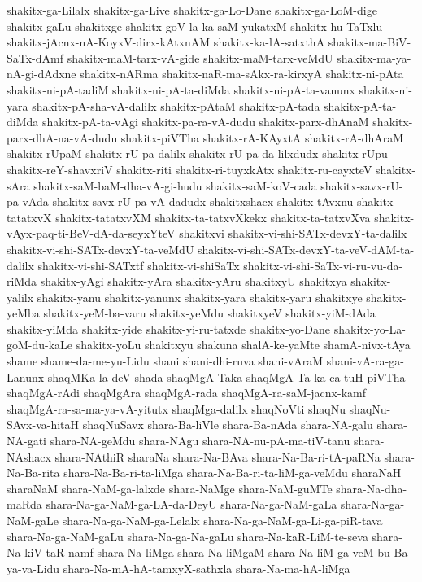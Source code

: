 {shakitx-ga-Lilalx
shakitx-ga-Live
shakitx-ga-Lo-Dane
shakitx-ga-LoM-dige
shakitx-gaLu
shakitxge
shakitx-goV-la-ka-saM-yukatxM
shakitx-hu-TaTxlu
shakitx-jAcnx-nA-KoyxV-dirx-kAtxnAM
shakitx-ka-lA-satxthA
shakitx-ma-BiV-SaTx-dAmf
shakitx-maM-tarx-vA-gide
shakitx-maM-tarx-veMdU
shakitx-ma-ya-nA-gi-dAdxne
shakitx-nARma
shakitx-naR-ma-sAkx-ra-kirxyA
shakitx-ni-pAta
shakitx-ni-pA-tadiM
shakitx-ni-pA-ta-diMda
shakitx-ni-pA-ta-vanunx
shakitx-ni-yara
shakitx-pA-sha-vA-dalilx
shakitx-pAtaM
shakitx-pA-tada
shakitx-pA-ta-diMda
shakitx-pA-ta-vAgi
shakitx-pa-ra-vA-dudu
shakitx-parx-dhAnaM
shakitx-parx-dhA-na-vA-dudu
shakitx-piVTha
shakitx-rA-KAyxtA
shakitx-rA-dhAraM
shakitx-rUpaM
shakitx-rU-pa-dalilx
shakitx-rU-pa-da-lilxdudx
shakitx-rUpu
shakitx-reY-shavxriV
shakitx-riti
shakitx-ri-tuyxkAtx
shakitx-ru-cayxteV
shakitx-sAra
shakitx-saM-baM-dha-vA-gi-hudu
shakitx-saM-koV-cada
shakitx-savx-rU-pa-vAda
shakitx-savx-rU-pa-vA-dadudx
shakitxshacx
shakitx-tAvxnu
shakitx-tatatxvX
shakitx-tatatxvXM
shakitx-ta-tatxvXkekx
shakitx-ta-tatxvXva
shakitx-vAyx-paq-ti-BeV-dA-da-seyxYteV
shakitxvi
shakitx-vi-shi-SATx-devxY-ta-dalilx
shakitx-vi-shi-SATx-devxY-ta-veMdU
shakitx-vi-shi-SATx-devxY-ta-veV-dAM-ta-dalilx
shakitx-vi-shi-SATxtf
shakitx-vi-shiSaTx
shakitx-vi-shi-SaTx-vi-ru-vu-da-riMda
shakitx-yAgi
shakitx-yAra
shakitx-yAru
shakitxyU
shakitxya
shakitx-yalilx
shakitx-yanu
shakitx-yanunx
shakitx-yara
shakitx-yaru
shakitxye
shakitx-yeMba
shakitx-yeM-ba-varu
shakitx-yeMdu
shakitxyeV
shakitx-yiM-dAda
shakitx-yiMda
shakitx-yide
shakitx-yi-ru-tatxde
shakitx-yo-Dane
shakitx-yo-La-goM-du-kaLe
shakitx-yoLu
shakitxyu
shakuna
shalA-ke-yaMte
shamA-nivx-tAya
shame
shame-da-me-yu-Lidu
shani
shani-dhi-ruva
shani-vAraM
shani-vA-ra-ga-Lanunx
shaqMKa-la-deV-shada
shaqMgA-Taka
shaqMgA-Ta-ka-ca-tuH-piVTha
shaqMgA-rAdi
shaqMgAra
shaqMgA-rada
shaqMgA-ra-saM-jacnx-kamf
shaqMgA-ra-sa-ma-ya-vA-yitutx
shaqMga-dalilx
shaqNoVti
shaqNu
shaqNu-SAvx-va-hitaH
shaqNuSavx
shara-Ba-liVle
shara-Ba-nAda
shara-NA-galu
shara-NA-gati
shara-NA-geMdu
shara-NAgu
shara-NA-nu-pA-ma-tiV-tanu
shara-NAshacx
shara-NAthiR
sharaNa
shara-Na-BAva
shara-Na-Ba-ri-tA-paRNa
shara-Na-Ba-rita
shara-Na-Ba-ri-ta-liMga
shara-Na-Ba-ri-ta-liM-ga-veMdu
sharaNaH
sharaNaM
shara-NaM-ga-lalxde
shara-NaMge
shara-NaM-guMTe
shara-Na-dha-maRda
shara-Na-ga-NaM-ga-LA-da-DeyU
shara-Na-ga-NaM-gaLa
shara-Na-ga-NaM-gaLe
shara-Na-ga-NaM-ga-Lelalx
shara-Na-ga-NaM-ga-Li-ga-piR-tava
shara-Na-ga-NaM-gaLu
shara-Na-ga-Na-gaLu
shara-Na-kaR-LiM-te-seva
shara-Na-kiV-taR-namf
shara-Na-liMga
shara-Na-liMgaM
shara-Na-liM-ga-veM-bu-Ba-ya-va-Lidu
shara-Na-mA-hA-tamxyX-sathxla
shara-Na-ma-hA-liMga
}
